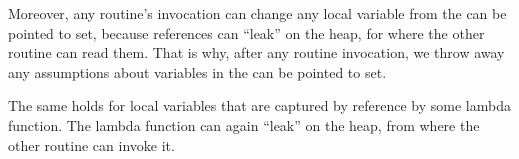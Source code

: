         Moreover, any routine's invocation can change any local 
        variable from the can be pointed to set, because 
        references can ``leak'' on the heap, for where 
        the other routine can read them. That is why, after any routine 
        invocation, we throw away any assumptions about variables 
        in the can be pointed to set.
        
        The same holds for local variables that are captured by 
        reference by some lambda function. The lambda function can 
        again ``leak'' on the heap, from where the other routine 
        can invoke it.
        
        
        